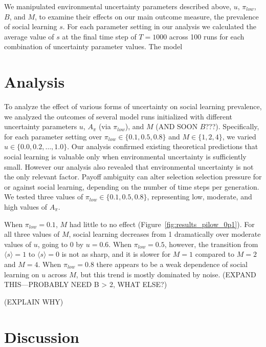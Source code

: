\documentclass[letterpaper,11.5pt]{scrartcl}
\begin{document}
We manipulated environmental uncertainty parameters described above, $u$,
$\pi_{low}$, $B$, and $M$, to examine their effects on our
main outcome measure, the prevalence of social learning $s$. For each parameter setting
in our analysis we calculated the average value of $s$ at the final time step
of $T=1000$ across 100 runs for each combination of uncertainty parameter values.
The model 



\section{Analysis}

To analyze the effect of various forms of uncertainty on social learning 
prevalence, we analyzed the outcomes of several model runs initialized with
different uncertainty parameters $u$, $A_\pi$ (via $\pi_{low}$), 
and $M$ (AND SOON $B$???). Specifically, for each parameter setting over
$\pi_{low} \in \{0.1, 0.5, 0.8\}$ and $M \in \{1, 2, 4\}$, we varied 
$u \in \{0.0, 0.2, \ldots, 1.0\}$.
Our analysis confirmed existing theoretical predictions that social learning
is valuable only when environmental uncertainty is sufficiently small. However
our analysis also revealed that environmental uncertainty is not the only 
relevant factor. Payoff ambiguity can alter selection selection pressure for or
against social learning, depending on the number of time steps per generation.
We tested three values of $\pi_{low} \in \{0.1, 0.5, 0.8\}$, representing
low, moderate, and high values of $A_\pi$. 

When $\pi_{low} = 0.1$, $M$ had little to no effect (Figure~\ref{fig:results_pilow_0p1}).
For all three values of $M$, social learning decreases from 1 dramatically over moderate
values of $u$, going to 0 by $u=0.6$. When $\pi_{low}=0.5$, however, the 
transition from $\langle s \rangle = 1$ to $\langle s \rangle = 0$ is not as
sharp, and it is slower for $M=1$ compared to $M=2$ and $M=4$. When $\pi_{low} = 0.8$
there appears to be a weak dependence of social learning on $u$ across $M$,
but this trend is mostly dominated by noise.
(EXPAND THIS---PROBABLY NEED B > 2, WHAT ELSE?)

(EXPLAIN WHY)




\section{Discussion}




\setlength{\bibleftmargin}{.125in}
\setlength{\bibindent}{-\bibleftmargin}

% 

\end{document}
